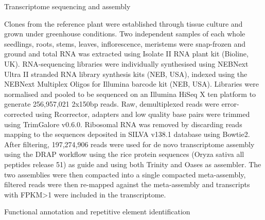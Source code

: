 \protect\hypertarget{anchor-8}{}{}Transcriptome sequencing and assembly

Clones from the reference plant were established through tissue culture
and grown under greenhouse conditions. Two independent samples of each
whole seedlings, roots, stems, leaves, inflorescence, meristems were
snap-frozen and ground and total RNA was extracted using Isolate II RNA
plant kit (Bioline, UK). RNA-sequencing libraries were individually
synthesised using NEBNext Ultra II stranded RNA library synthesis kits
(NEB, USA), indexed using the NEBNext Multiplex Oligos for Illumina
barcode kit (NEB, USA). Libraries were normalised and pooled to be
sequenced on an Illumina HiSeq X ten platform to generate 256,957,021
2x150bp reads. Raw, demultiplexed reads were error-corrected using
Rcorrector, adapters and low quality base pairs were trimmed using
TrimGalore v0.6.0. Ribosomal RNA was removed by discarding reads mapping
to the sequences deposited in SILVA v138.1 database using Bowtie2. After
filtering, 197,274,906 reads were used for de novo transcriptome
assembly using the DRAP workflow using the rice protein sequences (Oryza
sativa all peptides release 51) as guide and using both Trinity and
Oases as assembler. The two assemblies were then compacted into a single
compacted meta-assembly, filtered reads were then re-mapped against the
meta-assembly and transcripts with FPKM\textgreater1 were included in
the transcriptome.

\protect\hypertarget{anchor-9}{}{}Functional annotation and repetitive
element identification

